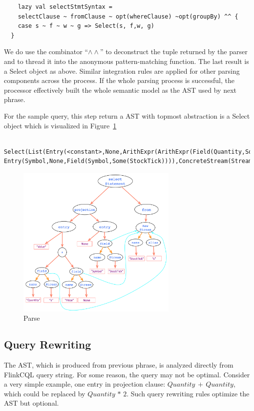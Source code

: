 \begin{itemize}
\begin{lstlisting}
	lazy val selectStmtSyntax = 
	selectClause ~ fromClause ~ opt(whereClause) ~opt(groupBy) ^^ {
    case s ~ f ~ w ~ g => Select(s, f,w, g)
  }
\end{lstlisting}

We do use the combinator ``$\wedge \wedge$'' to deconstruct the tuple returned by the parser and to thread it into the anonymous pattern-matching function. The last result is a Select object as above. Similar integration rules are applied for other parsing components across the process. 
If the whole parsing process is successful, the processor effectively built the whole semantic model as the AST used by next phrase.

For the sample query, this step return a AST with topmost abstraction is a Select object which is visualized in Figure~\ref{fig:Parse}

\begin{lstlisting}
	Select(List(Entry(<constant>,None,ArithExpr(ArithExpr(Field(Quantity,Some(s)),*,Field(Price,None)),+,Constant((Double,Double),10.2,double))), Entry(Symbol,None,Field(Symbol,Some(StockTick)))),ConcreteStream(Stream(StockTick,Some(s),false),None,None),None,None)
\end{lstlisting}
 

\end{itemize}


\begin{figure}[h!] 
\centering    
\includegraphics[width=0.7\textwidth]{Parse}
\caption{Parse}
\label{fig:Parse}
\end{figure}


\subsection{Query Rewriting}
The AST, which is produced from previous phrase, is analyzed directly from FlinkCQL query string. For some reason, the query may not be optimal. Consider a very simple example, one entry in projection clause: $Quantity\, +\, Quantity$, which could be replaced by $Quantity\, *\, 2$. Such query rewriting rules optimize the AST but optional. 


